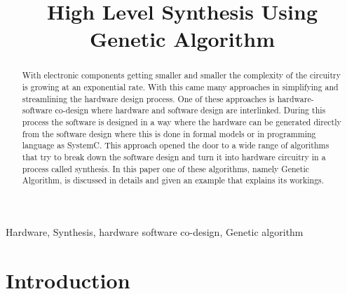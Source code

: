 \documentclass[conference]{IEEEtran}
\begin{document}
\title{High Level Synthesis Using Genetic Algorithm\\
}

\author{
}

\maketitle

\begin{abstract}
With electronic components getting smaller and smaller the complexity of the circuitry is growing at an exponential rate. With this came many approaches in simplifying and streamlining the hardware design process. One of these approaches is hardware-software co-design where hardware and software design are interlinked. During this process the software is designed in a way where the hardware can be generated directly from the software design where this is done in formal models or in programming language as SystemC. This approach opened the door to a wide range of algorithms that try to break down the software design and turn it into hardware circuitry in a process called synthesis. In this paper one of these algorithms, namely Genetic Algorithm, is discussed in details and given an example that explains its workings.
\end{abstract}

\begin{IEEEkeywords}
Hardware, Synthesis, hardware software co-design, Genetic algorithm
\end{IEEEkeywords}

\section{Introduction}
\end{document}
